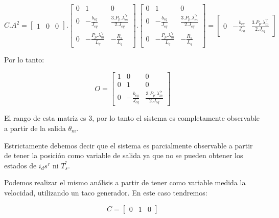 \documentclass{article}
\begin{document}
\begin{equation}
    C.A^2 =
    \begin{bmatrix}
        1 & 0 & 0
    \end{bmatrix}.
    \begin{bmatrix}
        0 & 1 & 0 \\
        0 & -\frac{b_{eq}}{J_{eq}} & \frac{3.P_p.\lambda_m^{\prime r}}{2.J_{eq}} \\
        0 & -\frac{P_p.\lambda_m^{\prime r}}{L_q} & -\frac{R_s}{L_q}
    \end{bmatrix}.
    \begin{bmatrix}
        0 & 1 & 0 \\
        0 & -\frac{b_{eq}}{J_{eq}} & \frac{3.P_p.\lambda_m^{\prime r}}{2.J_{eq}} \\
        0 & -\frac{P_p.\lambda_m^{\prime r}}{L_q} & -\frac{R_s}{L_q}
    \end{bmatrix}
    =
    \begin{bmatrix}
        0 & -\frac{b_{eq}}{J_{eq}} & \frac{3.P_p.\lambda_m^{\prime r}}{2.J_{eq}}
    \end{bmatrix}
\end{equation}

Por lo tanto:

\begin{equation}
    O = 
    \begin{bmatrix}
        1 & 0 & 0 \\
        0 & 1 & 0 \\
        0 & -\frac{b_{eq}}{J_{eq}} & \frac{3.P_p.\lambda_m^{\prime r}}{2.J_{eq}}
    \end{bmatrix}
\end{equation}

El rango de esta matriz es 3, por lo tanto el sistema es completamente observable a partir de la 
salida $\theta_m$.

Estrictamente debemos decir que el sistema es parcialmente observable a partir de tener la posición 
como variable de salida ya que no se pueden obtener los estados de $i_ds^r$ ni $T_s^°$.

Podemos realizar el mismo análisis a partir de tener como variable medida la velocidad, utilizando 
un taco generador. En este caso tendremos:

\begin{equation}
    C = \begin{bmatrix}
        0 & 1 & 0
    \end{bmatrix}
\end{equation}
\end{document}
